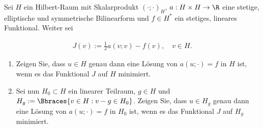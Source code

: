 
\begin{exercise}

Sei $H$ ein Hilbert-Raum mit Skalarprodukt $(\cdot; \cdot)_H$, $a: H \times H \to \R$ eine stetige, elliptische und symmetrische Bilinearform und $f \in H^\ast$ ein stetiges, lineares Funktional.
Weiter sei

\begin{align}
  J(v) := \frac{1}{2} a(v;v) - f(v),
  \quad
  v \in H.
\end{align}

\begin{enumerate}[label = \textbf{\alph*)}]

  \item Zeigen Sie, dass $u \in H$ genau dann eine Lösung von $a(u; \cdot) = f$ in $H$ ist, wenn es das Funktional $J$ auf $H$ minimiert.

  \item Sei nun $H_0 \subset H$ ein linearer Teilraum, $g \in H$ und $H_g := \Bbraces{v \in H: v - g \in H_0}$.
  Zeigen Sie, dass $u \in H_g$ genau dann eine Lösung von $a(u; \cdot) = f$ in $H_0$ ist, wenn es das Funktional $J$ auf $H_g$ minimiert.

\end{enumerate}

\end{exercise}


